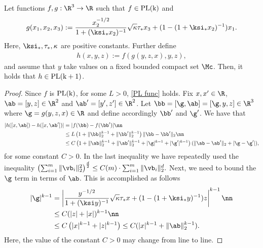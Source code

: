 \begin{lemma}\label{lem:hPL}
Let functions $f,g:\R^3\rightarrow\R$ such that $f\in\rm{PL}(k)$ and 
$$
g(x_1,x_2,x_3) := \frac{x_2^{-1/2}}{1+(\ksi_* x_2)^{-1}}\sqrt{\kappa}\tau_* x_3 + (1-(1+\ksi_*x_2)^{-1})x_1.
$$
Here, $\ksi_*,\tau_*,\kappa$ are positive constants. 
Further define 
\begin{align}
h(x,y,z) := f\left(g(y,z,x),y,z\right),
\end{align}
and assume that $y$ take values on a fixed bounded compact set $\Mc$.
Then, it holds that $h\in\rm{PL}(k+1)$.
\end{lemma}

\begin{proof}
Since $f$ is $\rm{PL}(k)$, for some $L>0$, \eqref{PL func} holds. Fix $x,x'\in\R$, $\ab=[y,z]\in\R^{2}$ and $\ab'=[y',z']\in\R^{2}$. Let $\bb=[\g,\ab]=[\g,y,z]\in\R^3$ where $\g=g(y,z,x)\in\R$ and define accordingly $\bb'$ and $\g'$. We have that
\begin{align}
|h([x,\ab])-h([x,\ab'])|&= |f(\bb)-f(\bb')|\nn\\
&\leq L\left(1+\|\bb\|_2^{k-1}+\|\bb'\|_2^{k-1}\right)\|\bb-\bb'\|_2\nn\\
&\leq C\left(1+\|\ab\|_2^{k-1}+\|\ab'\|_2^{k-1}+|\g|^{k-1}+|\g'|^{k-1}\right)(\|\ab-\ab'\|_2+|\g-\g'|),\label{eq:hlip}
\end{align}
for some constant $C>0$. In the last inequality we have repeatedly used the inequality
$
\left(\sum_{i=1}^m \|\vb_i\|_2^2\right)^{\frac{d}{2}} \leq  C(m)\cdot\sum_{i=1}^m\|\vb_i\|_2^{d}.
$
Next, we need to bound the $\g$ term in terms of $\ab$. This is accomplished as follows
\begin{align}
|\g|^{k-1} &= \left|\frac{y^{-1/2}}{1+(\ksi y)^{-1}}\sqrt{\kappa}\tau_* x + (1-(1+\ksi_*y)^{-1})z\right|^{k-1}\nn\\
&\leq C (|z|+|x|)^{k-1} \nn\\
&\leq C \left(|x|^{k-1}+|z|^{k-1}\right) \leq C (|x|^{k-1} + \|\ab\|_2^{k-1}).\label{eq:gb}
\end{align}
Here, the value of the constant $C>0$ may change from line to line. 

\end{proof}
